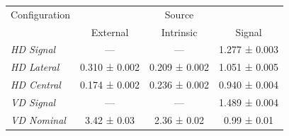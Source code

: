 \begin{tabular}{lccc}
    \toprule
    Configuration & \multicolumn{3}{c}{Source} \\
     & External & Intrinsic & Signal \\
    \midrule
    \emph{HD Signal} & --- & --- & 1.277 ± 0.003 \\
    \emph{HD Lateral} & 0.310 ± 0.002 & 0.209 ± 0.002 & 1.051 ± 0.005 \\
    \emph{HD Central} & 0.174 ± 0.002 & 0.236 ± 0.002 & 0.940 ± 0.004 \\
    \emph{VD Signal} & --- & --- & 1.489 ± 0.004 \\
    \emph{VD Nominal} & 3.42 ± 0.03 & 2.36 ± 0.02 & 0.99 ± 0.01 \\
    \bottomrule
\end{tabular}